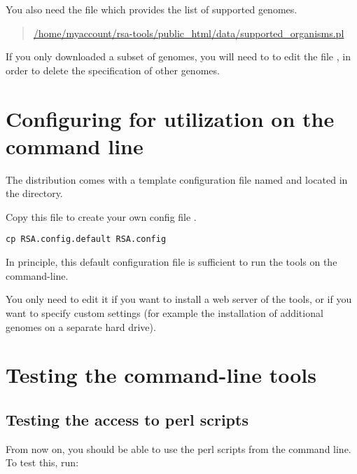 \documentclass{article}
\begin{document}
You also need the file which provides the list of supported genomes.

\begin{quote}
\url{/home/myaccount/rsa-tools/public\_html/data/supported\_organisms.pl}
\end{quote}

\begin{quote}
\end{quote}

If you only downloaded a subset of genomes, you will need to to edit
the file , in order to delete the
specification of other genomes.

\section{Configuring \RSAT for utilization on the command line}

The \RSAT distribution comes with a template configuration file named
 and located in the 
directory.

Copy this file to create your own config file .

\begin{verbatim}
cp RSA.config.default RSA.config
\end{verbatim}

In principle, this default configuration file is sufficient to run the
tools on the command-line. 

You only need to edit it if you want to install a web server of the
tools, or if you want to specify custom settings (for example the
installation of additional genomes on a separate hard drive).


\section{Testing the command-line tools}

\subsection{Testing the access to perl scripts}

From now on, you should be able to use the perl scripts from the
command line. To test this, run: 
\end{document}
